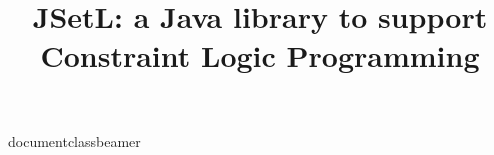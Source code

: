 documentclass{beamer}
\usepackage[italian]{babel}
\usepackage[latin1]{inputenc}
\usepackage{amsmath}
\usepackage{amssymb}
\usepackage{latexsym}
\usepackage{listings}
\usepackage{graphicx}
\usepackage{etoolbox}
\usepackage{subfiles}
\usepackage{verbatim}
\usepackage{xcolor}
\usepackage{tikz}
\usetikzlibrary{quotes,angles,positioning}
\usepackage{xcolor} %




\title {JSetL: a Java library to support Constraint Logic Programming}

